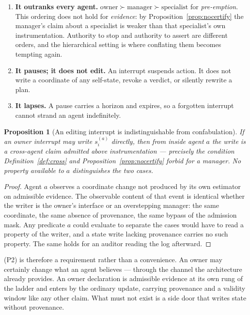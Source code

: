 \documentclass[11pt]{article}
\newtheorem{proposition}{Proposition}
\begin{document}
\begin{enumerate}[label=\textbf{(P\arabic*)},leftmargin=3.0em,itemsep=4pt]
\item \textbf{It outranks every agent.} $\text{owner}\succ\text{manager}\succ\text{specialist}$ for \emph{pre-emption}. This ordering does not hold for \emph{evidence}: by Proposition~\ref{prop:nocertify} the manager's claim about a specialist is weaker than that specialist's own instrumentation. Authority to stop and authority to assert are different orders, and the hierarchical setting is where conflating them becomes tempting again.
\item \textbf{It pauses; it does not edit.} An interrupt suspends action. It does not write a coordinate of any self-state, revoke a verdict, or silently rewrite a plan.
\item \textbf{It lapses.} A pause carries a horizon and expires, so a forgotten interrupt cannot strand an agent indefinitely.
\end{enumerate}

\begin{proposition}[An editing interrupt is indistinguishable from confabulation]
\label{prop:editinterrupt}
If an owner interrupt may write $s^{(a)}_i$ directly, then from inside agent $a$ the write is a cross-agent claim admitted above instrumentation --- precisely the condition Definition~\ref{def:cross} and Proposition~\ref{prop:nocertify} forbid for a manager. No property available to $a$ distinguishes the two cases.
\end{proposition}

\begin{proof}
Agent $a$ observes a coordinate change not produced by its own estimator on admissible evidence. The observable content of that event is identical whether the writer is the owner's interface or an overstepping manager: the same coordinate, the same absence of provenance, the same bypass of the admission mask. Any predicate $a$ could evaluate to separate the cases would have to read a property of the writer, and a state write lacking provenance carries no such property. The same holds for an auditor reading the log afterward.
\end{proof}

(P2) is therefore a requirement rather than a convenience. An owner may certainly change what an agent believes --- through the channel the architecture already provides. An owner declaration is admissible evidence at its own rung of the ladder and enters by the ordinary update, carrying provenance and a validity window like any other claim. What must not exist is a side door that writes state without provenance.
\end{document}
